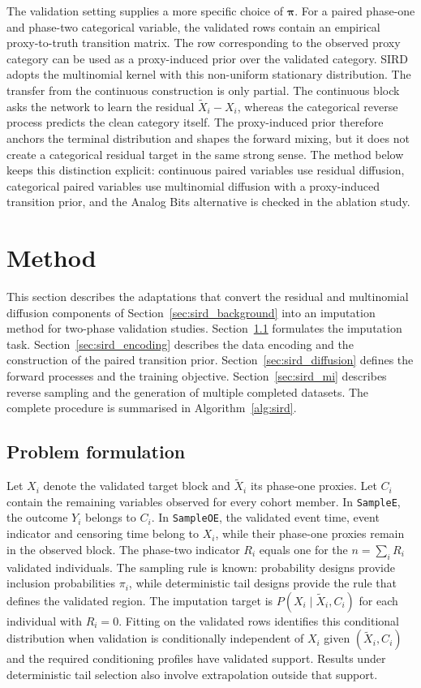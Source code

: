 The validation setting supplies a more specific choice of \(\boldsymbol{\pi}\). For a paired phase-one and phase-two categorical variable, the validated rows contain an empirical proxy-to-truth transition matrix. The row corresponding to the observed proxy category can be used as a proxy-induced prior over the validated category. SIRD adopts the multinomial kernel with this non-uniform stationary distribution. The transfer from the continuous construction is only partial. The continuous block asks the network to learn the residual \(\tilde X_i-X_i\), whereas the categorical reverse process predicts the clean category itself. The proxy-induced prior therefore anchors the terminal distribution and shapes the forward mixing, but it does not create a categorical residual target in the same strong sense. The method below keeps this distinction explicit: continuous paired variables use residual diffusion, categorical paired variables use multinomial diffusion with a proxy-induced transition prior, and the Analog Bits alternative is checked in the ablation study.


\section{Method}
\label{sec:sird_method}

This section describes the adaptations that convert the residual and multinomial diffusion components of Section~\ref{sec:sird_background} into an imputation method for two-phase validation studies. Section~\ref{sec:sird_problem} formulates the imputation task. Section~\ref{sec:sird_encoding} describes the data encoding and the construction of the paired transition prior. Section~\ref{sec:sird_diffusion} defines the forward processes and the training objective. Section~\ref{sec:sird_mi} describes reverse sampling and the generation of multiple completed datasets. The complete procedure is summarised in Algorithm~\ref{alg:sird}.


\subsection{Problem formulation}
\label{sec:sird_problem}

Let $X_i$ denote the validated target block and $\tilde X_i$ its phase-one proxies. Let $C_i$ contain the remaining variables observed for every cohort member. In \texttt{SampleE}, the outcome $Y_i$ belongs to $C_i$. In \texttt{SampleOE}, the validated event time, event indicator and censoring time belong to $X_i$, while their phase-one proxies remain in the observed block. The phase-two indicator $R_i$ equals one for the $n=\sum_iR_i$ validated individuals. The sampling rule is known: probability designs provide inclusion probabilities $\pi_i$, while deterministic tail designs provide the rule that defines the validated region. The imputation target is $P(X_i\mid\tilde X_i,C_i)$ for each individual with $R_i=0$. Fitting on the validated rows identifies this conditional distribution when validation is conditionally independent of $X_i$ given $(\tilde X_i,C_i)$ and the required conditioning profiles have validated support. Results under deterministic tail selection also involve extrapolation outside that support.

